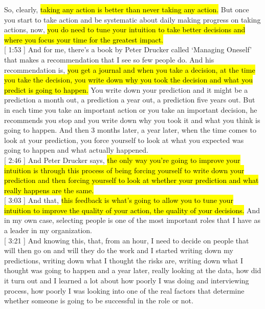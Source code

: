 \documentclass[a4paper,12pt]{article}
\begin{document}
So, clearly, \hl{taking any action is better than never taking any action.} But once you start to take action and be systematic about daily making progress on taking actions, now, \hl{you do need to tune your intuition to take better decisions and where you focus your time for the greatest impact.} \\

[ 1:53 ] And for me, there's a book by Peter Drucker called `Managing Oneself' that makes a recommendation that I see so few people do. And his recommendation is, \hl{you get a journal and when you take a decision, at the time you take the decision, you write down why you took the decision and what you predict is going to happen.} You write down your prediction and it might be a prediction a month out, a prediction a year out, a prediction five years out. But in each time you take an important action or you take an important decision, he recommends you stop and you write down why you took it and what you think is going to happen. And then 3 months later, a year later, when the time comes to look at your prediction, you force yourself to look at what you expected was going to happen and what actually happened. \\

[ 2:46 ] And Peter Drucker says, \hl{the only way you're going to improve your intuition is through this process of being forcing yourself to write down your prediction and then forcing yourself to look at whether your prediction and what really happens are the same.} \\

[ 3:03 ] And that, \hl{this feedback is what's going to allow you to tune your intuition to improve the quality of your action, the quality of your decisions.} And in my own case, selecting people is one of the most important roles that I have as a leader in my organization. \\

[ 3:21 ] And knowing this, that, from an hour, I need to decide on people that will then go on and will they do the work and I started writing down my predictions, writing down what I thought the risks are, writing down what I thought was going to happen and a year later, really looking at the data, how did it turn out and I learned a lot about how poorly I was doing and interviewing process, how poorly I was looking into one of the real factors that determine whether someone is going to be successful in the role or not. \\
\end{document}
